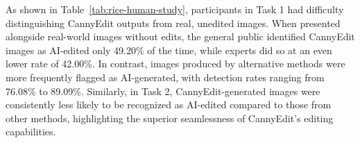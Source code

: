 \documentclass{article}
\begin{document}
As shown in Table~\ref{tab:rice-human-study}, participants in Task 1 had difficulty distinguishing CannyEdit outputs from real, unedited images. When presented alongside real-world images without edits, the general public identified CannyEdit images as AI-edited only 49.20\% of the time, while experts did so at an even lower rate of 42.00\%. In contrast, images produced by alternative methods were more frequently flagged as AI-generated, with detection rates ranging from 76.08\% to 89.09\%. Similarly, in Task 2, CannyEdit-generated images were consistently less likely to be recognized as AI-edited compared to those from other methods, highlighting the superior seamlessness of CannyEdit's editing capabilities.



\end{document}
